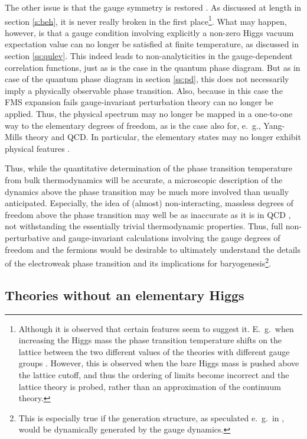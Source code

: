\documentclass[final,12pt,3p,longtitle]{elsarticle}
\newcommand*{\1}{1\!\!\!\bot}
\begin{document}
The other issue is that the gauge symmetry is restored \cite{Kapusta:2006pm}. As discussed at length in section \ref{s:beh}, it is never really broken in the first place\footnote{Although it is observed that certain features seem to suggest it. E.\ g.\ when increasing the Higgs mass the phase transition temperature shifts on the lattice between the two different values of the theories with different gauge groups \cite{Brower:1982yn,Kikugawa:1985ex,Wellegehausen:2011sc}. However, this is observed when the bare Higgs mass is pushed above the lattice cutoff, and thus the ordering of limits become incorrect and the lattice theory is probed, rather than an approximation of the continuum theory.}. What may happen, however, is that a gauge condition involving explicitly a non-zero Higgs vacuum expectation value can no longer be satisfied at finite temperature, as discussed in section \ref{ss:qulev}. This indeed leads to non-analyticities in the gauge-dependent correlation functions, just as is the case in the quantum phase diagram. But as in case of the quantum phase diagram in section \ref{ss:pd}, this does not necessarily imply a physically observable phase transition. Also, because in this case the FMS expansion fails gauge-invariant perturbation theory can no longer be applied. Thus, the physical spectrum may no longer be mapped in a one-to-one way to the elementary degrees of freedom, as is the case also for, e.\ g., Yang-Mills theory and QCD. In particular, the elementary states may no longer exhibit physical features \cite{Maas:2011se}.

Thus, while the quantitative determination of the phase transition temperature from bulk thermodynamics will be accurate, a microscopic description of the dynamics above the phase transition may be much more involved than usually anticipated. Especially, the idea of (almost) non-interacting, massless degrees of freedom above the phase transition may well be as inaccurate as it is in QCD \cite{Maas:2011se}, not withstanding the essentially trivial thermodynamic properties. Thus, full non-perturbative and gauge-invariant calculations involving the gauge degrees of freedom and the fermions would be desirable to ultimately understand the details of the electroweak phase transition and its implications for baryogenesis\footnote{This is especially true if the generation structure, as speculated e.\ g.\ in \cite{Egger:2017tkd}, would be dynamically generated by the gauge dynamics.}.

\subsection{Theories without an elementary Higgs}\label{ss:tc}
\end{document}
